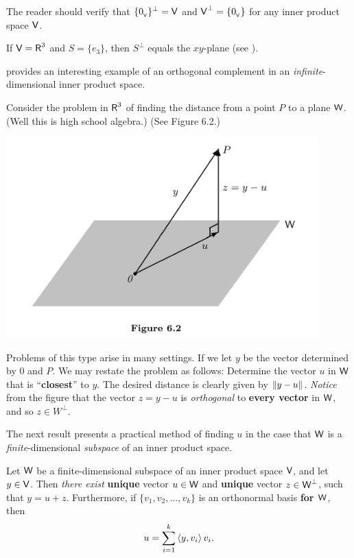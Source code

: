\begin{example} \label{example 6.2.8}
The reader should verify that \(\{ 0_{_{\textsf{V}}} \}^{\perp} = \textsf{V}\) and \(\textsf{V}^{\perp} = \{ 0_{_{\textsf{V}}} \}\) for any inner product space \(\textsf{V}\).
\end{example}

\begin{example} \label{example 6.2.9}
If \(\textsf{V} = \textsf{R}^3\) and \(S = \{ e_3 \}\), then \(S^{\perp}\) equals the \(xy\)-plane (see ).
\end{example}

 provides an interesting example of an orthogonal complement in an \emph{infinite}-dimensional inner product space. 
\begin{remark} \label{remark 6.2.7}
Consider the problem in \(\textsf{R}^3\) of finding the distance from a point \(P\) to a plane \(\textsf{W}\).
(Well this is high school algebra.)
(See Figure 6.2.)

\includegraphics[width=12cm]{images/figure-6-2.png}

Problems of this type arise in many settings.
If we let \(y\) be the vector determined by \(0\) and \(P\).
We may restate the problem as follows:
Determine the vector \(u\) in \(\textsf{W}\) that is ``\textbf{closest}'' to \(y\).
The desired distance is clearly given by \(\left\lVert y - u\right\rVert\).
\emph{Notice} from the figure that the vector \(z = y - u\) is \emph{orthogonal} to \textbf{every vector} in \(\textsf{W}\), and so \(z \in W^{\perp}\).

The next result presents a practical method of finding \(u\) in the case that \(\textsf{W}\) is a \emph{finite}-dimensional \emph{subspace} of an inner product space.
\end{remark}

\begin{theorem} \label{thm 6.6}
Let \(\textsf{W}\) be a finite-dimensional subspace of an inner product space \(\textsf{V}\), and let \(y \in \textsf{V}\).
Then \emph{there exist} \textbf{unique} vector \(u \in \textsf{W}\) and \textbf{unique} vector \(z \in \textsf{W}^{\perp}\), such that \(y = u + z\).
Furthermore, if \(\{ v_1, v_2, ..., v_k \}\) is an orthonormal basis \textbf{for \(\textsf{W}\)}, then
\[
    u = \sum_{i = 1}^k \left< y, v_i \right> v_i.
\]
\end{theorem}

